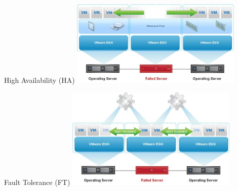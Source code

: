 \begin{center}
\begin{frame}{High Availability (HA)}
\includegraphics[width=310px]{Schemas/High_Aviability.jpg}
\end{frame}
\end{center}

\begin{center}
\begin{frame}{Fault Tolerance (FT)}
\includegraphics[width=310px]{Schemas/Fault_Tolerance.jpg}
\end{frame}
\end{center}